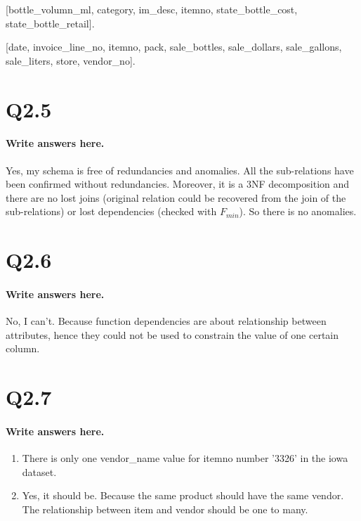 \documentclass{article}
\begin{document}
[bottle\_volumn\_ml, category, im\_desc, itemno, state\_bottle\_cost, state\_bottle\_retail].

[date, invoice\_line\_no, itemno, pack, sale\_bottles, sale\_dollars, sale\_gallons, sale\_liters, store, vendor\_no].


\section*{Q2.5}
\paragraph{Write answers here.}

Yes, my schema is free of redundancies and anomalies. 
All the sub-relations have been confirmed without redundancies.
Moreover, it is a 3NF decomposition and there are no lost joins (original relation could be recovered from the join of the sub-relations) or lost dependencies (checked with $F_{min}$).
So there is no anomalies.



\section*{Q2.6}
\paragraph{Write answers here.}
No, I can't. Because function dependencies are about relationship between attributes, hence they could not be used to constrain the value of one certain column.

\section*{Q2.7}
\paragraph{Write answers here.}
\begin{enumerate}[label=\alph*]
    \item There is only one vendor\_name value for itemno number '3326' in the iowa dataset.
    \item Yes, it should be. Because the same product should have the same vendor. The relationship between item and vendor should be one to many.
\end{enumerate}

\newpage
\end{document}
